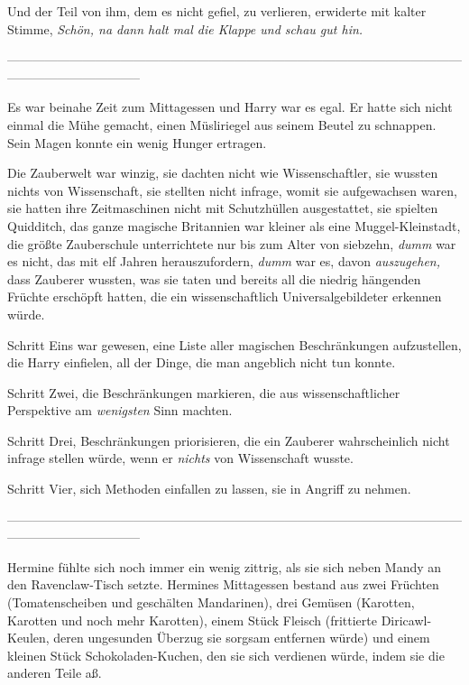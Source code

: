 {Und der Teil von ihm, dem es nicht gefiel, zu verlieren, erwiderte mit kalter Stimme, \emph{Schön, na dann halt mal die Klappe und schau gut hin.}

--------------------------------------------------------------------------------------------------------------------------------------------

Es war beinahe Zeit zum Mittagessen und Harry war es egal. Er hatte sich nicht einmal die Mühe gemacht, einen Müsliriegel aus seinem Beutel zu schnappen. Sein Magen konnte ein wenig Hunger ertragen.

Die Zauberwelt war winzig, sie dachten nicht wie Wissenschaftler, sie wussten nichts von Wissenschaft, sie stellten nicht infrage, womit sie aufgewachsen waren, sie hatten ihre Zeitmaschinen nicht mit Schutzhüllen ausgestattet, sie spielten Quidditch, das ganze magische Britannien war kleiner als eine Muggel-Kleinstadt, die größte Zauberschule unterrichtete nur bis zum Alter von siebzehn, \emph{dumm} war es nicht, das mit elf Jahren herauszufordern, \emph{dumm} war es, davon \emph{auszugehen,} dass Zauberer wussten, was sie taten und bereits all die niedrig hängenden Früchte erschöpft hatten, die ein wissenschaftlich Universalgebildeter erkennen würde.

Schritt Eins war gewesen, eine Liste aller magischen Beschränkungen aufzustellen, die Harry einfielen, all der Dinge, die man angeblich nicht tun konnte.

Schritt Zwei, die Beschränkungen markieren, die aus wissenschaftlicher Perspektive am \emph{wenigsten} Sinn machten.

Schritt Drei, Beschränkungen priorisieren, die ein Zauberer wahrscheinlich nicht infrage stellen würde, wenn er \emph{nichts} von Wissenschaft wusste.

Schritt Vier, sich Methoden einfallen zu lassen, sie in Angriff zu nehmen.

--------------------------------------------------------------------------------------------------------------------------------------------

Hermine fühlte sich noch immer ein wenig zittrig, als sie sich neben Mandy an den Ravenclaw-Tisch setzte. Hermines Mittagessen bestand aus zwei Früchten (Tomatenscheiben und geschälten Mandarinen), drei Gemüsen (Karotten, Karotten und noch mehr Karotten), einem Stück Fleisch (frittierte Diricawl-Keulen, deren ungesunden Überzug sie sorgsam entfernen würde) und einem kleinen Stück Schokoladen-Kuchen, den sie sich verdienen würde, indem sie die anderen Teile aß.

}
